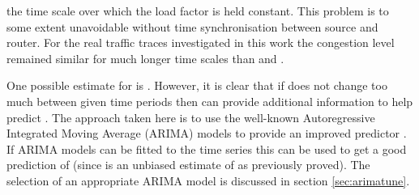 the time scale over which the load factor is held constant.  This
problem is to some extent unavoidable without time synchronisation
between source and router.
For the real traffic traces investigated in this work the congestion
level remained similar for
much longer time scales than  and .

One possible estimate for  is .
However, it is clear that if  does not change too much between
given
time periods then
 can provide additional
information to help predict . The approach taken here is to
use the well-known
Autoregressive Integrated Moving Average (ARIMA) models
to provide an improved predictor \cite{GBox}.  If
ARIMA models can be fitted to the time series  this can be used
to get a good prediction of 
(since  is an unbiased estimate of  as previously proved).
The selection of an appropriate ARIMA model is discussed
in section \ref{sec:arimatune}.

